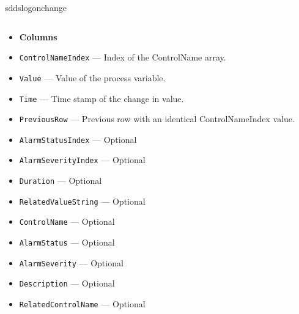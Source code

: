 \begin{sddsprog}{sddslogonchange}
\begin{itemize}
\begin{verbatim}
\end{verbatim}
  \begin{itemize}
    \item {\bf Columns}
    \item {\tt ControlNameIndex} --- Index of the ControlName array.
    \item {\tt Value} --- Value of the process variable.
    \item {\tt Time} --- Time stamp of the change in value.
    \item {\tt PreviousRow} --- Previous row with an identical ControlNameIndex value.
    \item {\tt AlarmStatusIndex} --- Optional
    \item {\tt AlarmSeverityIndex} --- Optional
    \item {\tt Duration} --- Optional
    \item {\tt RelatedValueString} --- Optional
    \item {\tt ControlName} --- Optional
    \item {\tt AlarmStatus} --- Optional
    \item {\tt AlarmSeverity} --- Optional
    \item {\tt Description} --- Optional
    \item {\tt RelatedControlName} --- Optional

  \end{itemize}

\end{itemize}


\end{sddsprog}
